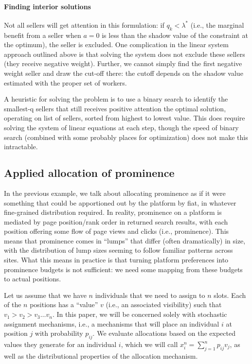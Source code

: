 \paragraph{Finding interior solutions}
Not all sellers will get attention in this formulation: if $q_k <
\lambda^*$ (i.e., the marginal benefit from a seller when $a=0$ is
less than the shadow value of the constraint at the optimum), the
seller is excluded. One complication in the linear system approach
outlined above is that solving the system does not exclude these
sellers (they receive negative weight). Further, we cannot simply find
the first negative weight seller and draw the cut-off there: the
cutoff depends on the shadow value estimated with the proper set of
workers. 

A heuristic for solving the problem is to use a binary search to
identify the smallest-q sellers that still receives positive attention
the optimal solution, operating on list of sellers, sorted from
highest to lowest value. This does require solving the system of
linear equations at each step, though the speed of binary search
(combined with some probably places for optimization) does not make
this intractable.  



%

\subsection{Applied allocation of prominence}
In the previous example, we talk about allocating prominence as if it
were something that could be apportioned out by the platform by fiat,
in whatever fine-grained distribution required. In reality, prominence
on a platform is mediated by page position/rank order in returned
search results, with each position offering some flow of page views
and clicks (i.e., prominence). This means that prominence comes in
``lumps'' that differ (often dramatically) in size, with the
distribution of lump sizes seeming to follow familiar patterns across
sites. What this means in practice is that turning platform
preferences into prominence budgets is not sufficient: we need some
mapping from these budgets to actual positions.

Let us assume that we have $n$ individuals that we need to assign to
$n$ slots. Each of the $n$ positions has a ``value'' $v$ (i.e., an
associated visibility) such that $v_1 > v_2 > v_3 \ldots v_n$. In this
paper, we will be concerned solely with stochastic assignment
mechanisms, i.e., a mechanisms that will place an individual $i$ at
position $j$ with probability $p_{ij}$. We evaluate allocations based
on the expected values they generate for an individual $i$, which we
will call $x^n_i = \sum_{j=1}^n p_{ij}v_j$, as well as the
distributional properties of the allocation mechanism.

